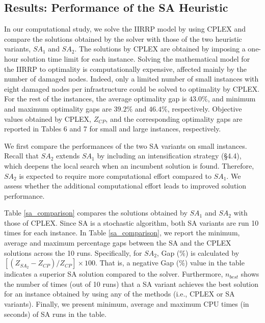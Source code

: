 \documentclass[11pt]{article}
\begin{document}


\subsection{Results: Performance of the SA Heuristic} \label{test_evaluation}

In our computational study, we solve the IIRRP model by using CPLEX and compare the solutions obtained by the solver with those of the two heuristic variants, $SA_{1}$ and $SA_{2}$. The solutions by CPLEX are obtained by imposing a one-hour solution time limit for each instance. Solving the mathematical model for the IIRRP to optimality is computationally expensive, affected mainly by the number of damaged nodes. Indeed, only a limited number of small instances with eight damaged nodes per infrastructure could be solved to optimality by CPLEX. For the rest of the instances, the average optimality gap is $43.0\%$, and minimum and maximum optimality gaps are $39.2\%$ and $46.4\%$, respectively. Objective values obtained by CPLEX, $Z_{CP}$, and the corresponding optimality gaps are reported in Tables 6 and 7 for small and large instances, respectively. 

We first compare the performances of the two SA variants on small instances. Recall that $SA_{2}$ extends $SA_{1}$ by including an intensification strategy (\S 4.4), which deepens the local search when an incumbent solution is found. Therefore, $SA_{2}$ is expected to require more computational effort compared to $SA_{1}$. We assess whether the additional computational effort leads to improved solution performance. 

Table \ref{sa_comparison} compares the solutions obtained by $SA_{1}$ and $SA_{2}$ with those of CPLEX. Since SA is a stochastic algorithm, both SA variants are run 10 times for each instance. In Table \ref{sa_comparison}, we report the minimum, average and maximum percentage gaps between the SA and the CPLEX solutions across the 10 runs. Specifically, for $SA_{2}$, Gap (\%) is calculated by $[(Z_{SA_{2}} - Z_{CP})/Z_{CP}] \times 100$. That is, a negative Gap (\%) value in the table indicates a superior SA solution compared to the solver. Furthermore, $n_{best}$ shows the number of times (out of 10 runs) that a SA variant achieves the best solution for an instance obtained by using any of the methods (i.e., CPLEX or SA variants). Finally, we present minimum, average and maximum CPU times (in seconds) of SA runs in the table.
\end{document}
